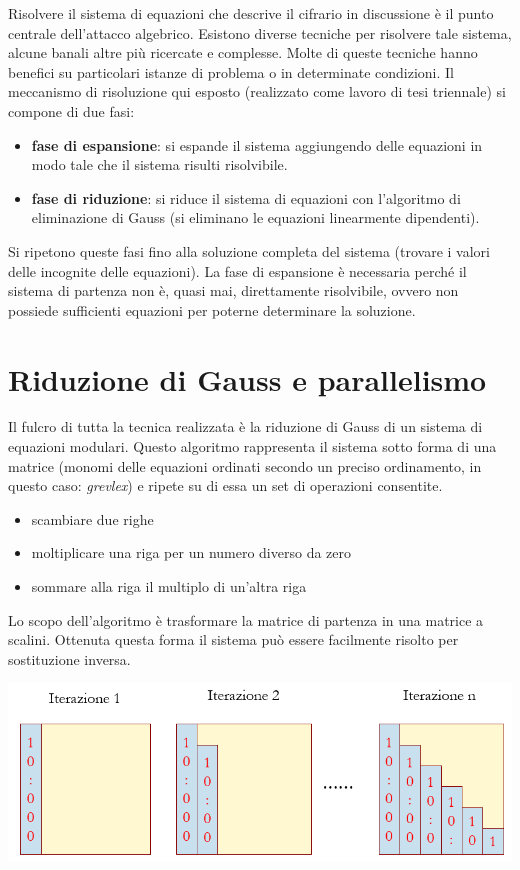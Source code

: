 \documentclass{article}
\begin{document}
Risolvere il sistema di equazioni che descrive il cifrario in discussione è il punto centrale dell'attacco algebrico. Esistono diverse tecniche per risolvere tale sistema, alcune banali altre più ricercate e complesse. Molte di queste tecniche hanno benefici su particolari istanze di problema o in determinate condizioni. Il meccanismo di risoluzione qui esposto (realizzato come lavoro di tesi triennale) si compone di due fasi: 

\begin{itemize}
\item \textbf{fase di espansione}: si espande il sistema aggiungendo delle equazioni in modo tale che il sistema risulti risolvibile.
\item \textbf{fase di riduzione}: si riduce il sistema di equazioni con l'algoritmo di eliminazione di Gauss (si eliminano le equazioni linearmente dipendenti).

\end{itemize}

Si ripetono queste fasi fino alla soluzione completa del sistema (trovare i valori delle incognite delle equazioni). La fase di espansione è necessaria perché il sistema di partenza non è, quasi mai, direttamente risolvibile, ovvero non possiede sufficienti equazioni per poterne determinare la soluzione.

\section{Riduzione di Gauss e parallelismo}

Il fulcro di tutta la tecnica realizzata è la riduzione di Gauss di un sistema di equazioni modulari. Questo algoritmo rappresenta il sistema sotto forma di una matrice (monomi delle equazioni ordinati secondo un preciso ordinamento, in questo caso: \textit{grevlex}) e ripete su di essa un set di operazioni consentite.
\begin{itemize}
\item scambiare due righe
\item moltiplicare una riga per un numero diverso da zero
\item sommare alla riga il multiplo di un'altra riga
\end{itemize}

Lo scopo dell'algoritmo è trasformare la matrice di partenza in una matrice a scalini. Ottenuta questa forma il sistema può essere facilmente risolto per sostituzione inversa.

	\begin{center}
		\includegraphics[width = \textwidth]{gauss.png}
		\label{fig:gauss}
	\end{center}
\end{document}
